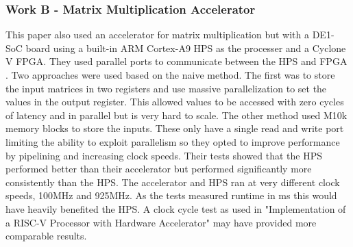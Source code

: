 \subsubsection{Work B - Matrix Multiplication Accelerator \citep{matrix_mult_accel}}
This paper also used an accelerator for matrix multiplication but with a DE1-SoC board using a built-in ARM Cortex-A9 HPS as the processer and a Cyclone V FPGA. They used parallel ports to communicate between the HPS and FPGA \cite{pio}. Two approaches were used based on the naive method. The first was to store the input matrices in two registers and use massive parallelization to set the values in the output register. This allowed values to be accessed with zero cycles of latency and in parallel but is very hard to scale. The other method used M10k memory blocks to store the inputs. These only have a single read and write port limiting the ability to exploit parallelism so they opted to improve performance by pipelining and increasing clock speeds. Their tests showed that the HPS performed better than their accelerator but performed significantly more consistently than the HPS. The accelerator and HPS ran at very different clock speeds, 100MHz and 925MHz. As the tests measured runtime in ms this would have heavily benefited the HPS. A clock cycle test as used in "Implementation of a RISC-V Processor with Hardware Accelerator" may have provided more comparable results.

